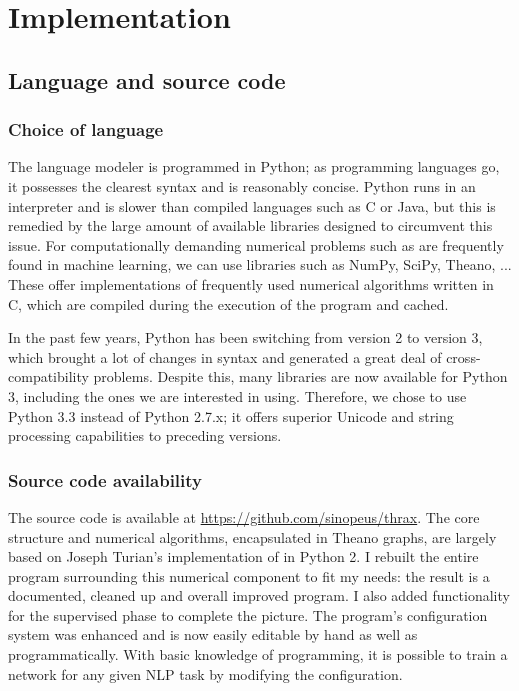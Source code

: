 
\chapter{Implementation}
\label{chp:implementation}

\section{Language and source code}
\label{sec:langsource}
\subsection{Choice of language}
\label{sec:language}
The language modeler is programmed in Python; as programming languages
go, it possesses the clearest syntax and is reasonably concise. Python
runs in an interpreter and is slower than compiled languages such as C
or Java, but this is remedied by the large amount of available
libraries designed to circumvent this issue. For computationally
demanding numerical problems such as are frequently found in machine
learning, we can use libraries such as NumPy, SciPy, Theano, ... These
offer implementations of frequently used numerical algorithms written
in C, which are compiled during the execution of the program and cached. 

In the past few years, Python has been switching from version 2 to
version 3, which brought a lot of changes in syntax and generated a
great deal of cross-compatibility problems. Despite this, many
libraries are now available for Python 3, including the ones we are
interested in using. Therefore, we chose to use Python 3.3 instead of
Python 2.7.x; it offers superior Unicode and string processing
capabilities to preceding versions.

\subsection{Source code availability}
\label{sec:sourcecode}
The source code is available at
\url{https://github.com/sinopeus/thrax}. The core structure and
numerical algorithms, encapsulated in Theano graphs, are largely based on
Joseph Turian's implementation of \citep{collobert2008} in
Python 2. I rebuilt the entire program surrounding this numerical
component to fit my needs: the result is a documented, cleaned up and
overall improved program. I also added functionality for the
supervised phase to complete the picture. The program's configuration
system was enhanced and is now easily editable by hand as well as
programmatically. With basic knowledge of programming, it is possible
to train a network for any given NLP task by modifying the
configuration.

